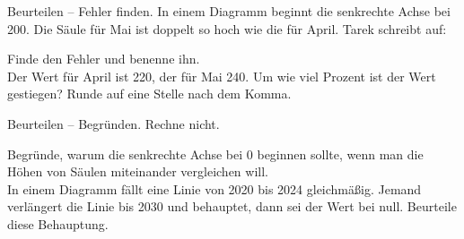 \begin{aufgabe}{Beurteilen -- Fehler finden.}
In einem Diagramm beginnt die senkrechte Achse bei 200. Die Säule für Mai ist doppelt so hoch wie die für April. Tarek schreibt auf:
\begin{teile}
\teil Finde den Fehler und benenne ihn. \\[12pt]
\teil Der Wert für April ist 220, der für Mai 240. Um wie viel Prozent ist der Wert gestiegen? Runde auf eine Stelle nach dem Komma. \leerfeld[\%]
\end{teile}
\end{aufgabe}

\begin{aufgabe}{Beurteilen -- Begründen. Rechne nicht.}
\begin{teile}
\teil Begründe, warum die senkrechte Achse bei 0 beginnen sollte, wenn man die Höhen von Säulen miteinander vergleichen will. \\[12pt]
\teil In einem Diagramm fällt eine Linie von 2020 bis 2024 gleichmäßig. Jemand verlängert die Linie bis 2030 und behauptet, dann sei der Wert bei null. Beurteile diese Behauptung. \\[12pt]
\end{teile}
\end{aufgabe}
